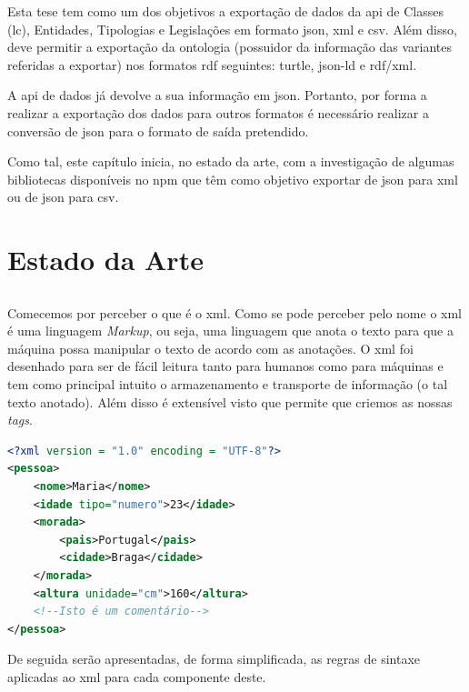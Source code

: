 Esta tese tem como um dos objetivos a exportação de dados da \acrshort{api} de Classes (\acrshort{lc}), Entidades, Tipologias e Legislações em formato \acrshort{json}, \acrshort{xml} e \acrshort{csv}. Além disso, deve permitir a exportação da ontologia (possuidor da informação das variantes referidas a exportar) nos formatos \acrshort{rdf} seguintes: \acrshort{turtle}, \acrshort{json-ld} e \acrshort{rdf}/\acrshort{xml}.

A \acrshort{api} de dados já devolve a sua informação em \acrshort{json}. Portanto, por forma a realizar a exportação dos dados para outros formatos é necessário realizar a conversão de \acrshort{json} para o formato de saída pretendido.

Como tal, este capítulo inicia, no estado da arte, com a investigação de algumas bibliotecas disponíveis no \acrshort{npm} que têm como objetivo exportar de \acrshort{json} para \acrshort{xml} ou de \acrshort{json} para \acrshort{csv}.

\section{Estado da Arte}\label{sec:exportacao}

\subsection{}

Comecemos por perceber o que é o \acrfull{xml}. Como se pode perceber pelo nome o \acrshort{xml} é uma linguagem \textit{Markup}, ou seja, uma linguagem que anota o texto para que a máquina possa manipular o texto de acordo com as anotações. O \acrshort{xml} foi desenhado para ser de fácil leitura tanto para humanos como para máquinas e tem como principal intuito o armazenamento e transporte de informação (o tal texto anotado). Além disso é extensível visto que permite que criemos as nossas \textit{tags}.

\begin{lstlisting}[language=xml, caption=Pequeno exemplo em \acrshort{xml}, label=exem:xmlEx]
<?xml version = "1.0" encoding = "UTF-8"?>
<pessoa>
    <nome>Maria</nome>
    <idade tipo="numero">23</idade>
    <morada>
        <pais>Portugal</pais>
        <cidade>Braga</cidade>
    </morada>
    <altura unidade="cm">160</altura>
    <!--Isto é um comentário-->
</pessoa>
\end{lstlisting}

De seguida serão apresentadas, de forma simplificada, as regras de sintaxe aplicadas ao \acrshort{xml} para cada componente deste.

